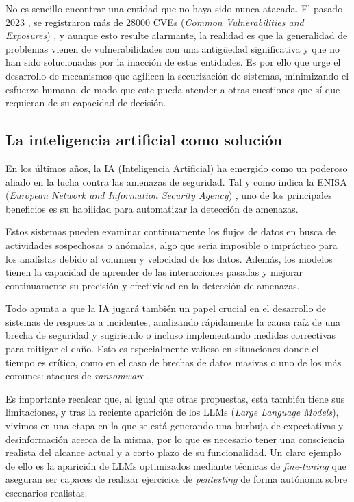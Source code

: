 No es sencillo encontrar una entidad que no haya sido nunca atacada. El pasado 2023 \cite{stormshield2023}, se registraron más de 28000 \gls{CVE}s (\textit{Common Vulnerabilities and Exposures}) \cite{cve-mitre}, y aunque esto resulte alarmante, la realidad es que la generalidad de problemas vienen de vulnerabilidades con una antigüedad significativa y que no han sido solucionadas por la inacción de estas entidades. Es por ello que urge el desarrollo de mecanismos que agilicen la securización de sistemas, minimizando el esfuerzo humano, de modo que este pueda atender a otras cuestiones que sí que requieran de su capacidad de decisión.

\subsection{La inteligencia artificial como solución}

En los últimos años, la \gls{IA} (Inteligencia Artificial) ha emergido como un poderoso aliado en la lucha contra las amenazas de seguridad. Tal y como indica la \gls{ENISA} (\textit{European Network and Information Security Agency}) \cite{enisa2020}, uno de los principales beneficios es su habilidad para automatizar la detección de amenazas. 

Estos sistemas pueden examinar continuamente los flujos de datos en busca de actividades sospechosas o anómalas, algo que sería imposible o impráctico para los analistas debido al volumen y velocidad de los datos. Además, los modelos tienen la capacidad de aprender de las interacciones pasadas y mejorar continuamente su precisión y efectividad en la detección de amenazas.

Todo apunta a que la IA jugará también un papel crucial en el desarrollo de sistemas de respuesta a incidentes, analizando rápidamente la causa raíz de una brecha de seguridad y sugiriendo o incluso implementando medidas correctivas para mitigar el daño. Esto es especialmente valioso en situaciones donde el tiempo es crítico, como en el caso de brechas de datos masivas o uno de los más comunes: ataques de \textit{ransomware} \cite{avtest-cyberincidents}.

Es importante recalcar que, al igual que otras propuestas, esta también tiene sus limitaciones, y tras la reciente aparición de los \gls{LLM}s (\textit{Large Language Models}), vivimos en una etapa en la que se está generando una burbuja de expectativas y desinformación acerca de la misma, por lo que es necesario tener una consciencia realista del alcance actual y a corto plazo de su funcionalidad. Un claro ejemplo de ello es la aparición de \gls{LLM}s optimizados mediante técnicas de \textit{fine-tuning} que aseguran ser capaces de realizar ejercicios de \textit{pentesting} \cite{deng2023pentestgpt} de forma autónoma sobre escenarios realistas.

